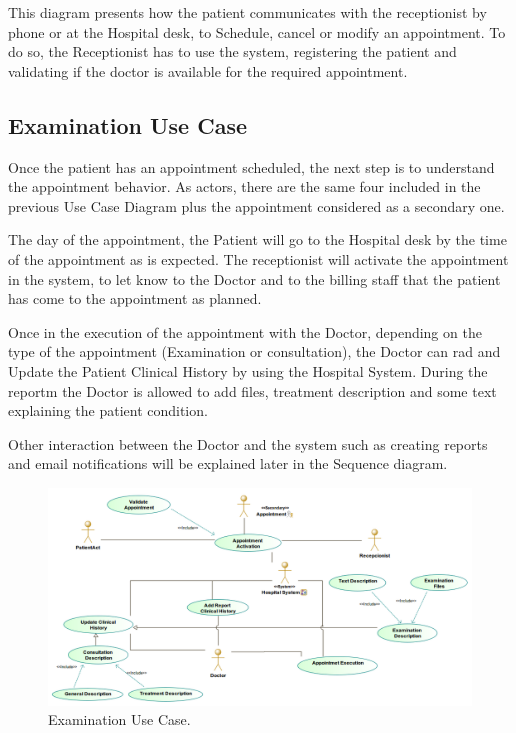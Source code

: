 \documentclass{article}
\begin{document}
            This diagram presents how the patient communicates with the receptionist by phone or at the Hospital desk, to Schedule, cancel or modify an appointment. To do so, the Receptionist has to use the
            system, registering the patient and validating if the doctor is available for the required appointment.

            \subsection{Examination Use Case}

            Once the patient has an appointment scheduled, the next step is to understand the appointment behavior. As actors, there are the same four included in the previous Use Case Diagram plus the appointment considered as a 
            secondary one.

            The day of the appointment, the Patient will go to the Hospital desk by the time of the appointment as is expected. The receptionist will activate the appointment in the system, to let know to the Doctor and to the billing 
            staff that the patient has come to the appointment as planned.

            Once in the execution of the appointment with the Doctor, depending on the type of the appointment (Examination or consultation), the Doctor can rad and Update the Patient Clinical History by using the Hospital System. During the reportm
            the Doctor is allowed to add files, treatment description and some text explaining the patient condition.

            Other interaction between the Doctor and the system such as creating reports and email notifications will be explained later in the Sequence diagram.
            \begin{figure}[H]
                \centering 
                \includegraphics[width=1\linewidth]{./img/cHistories.png}
                \caption{Examination Use Case.}
                \label{fig:examination}
            \end{figure}
            
\end{document}
